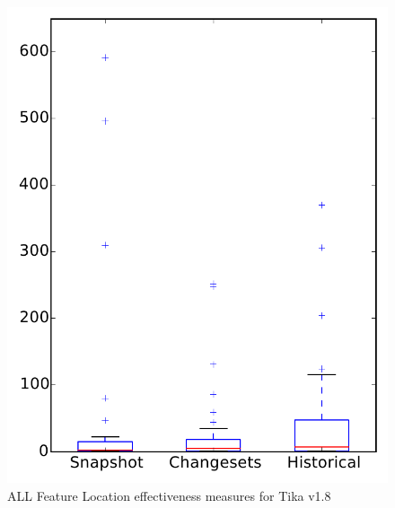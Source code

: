 
\begin{figure}
\centering
\includegraphics[height=0.4\textheight]{figures/flt/all_tika}
\caption{ALL Feature Location effectiveness measures for Tika v1.8}
\label{fig:flt:all:tika}
\end{figure}
